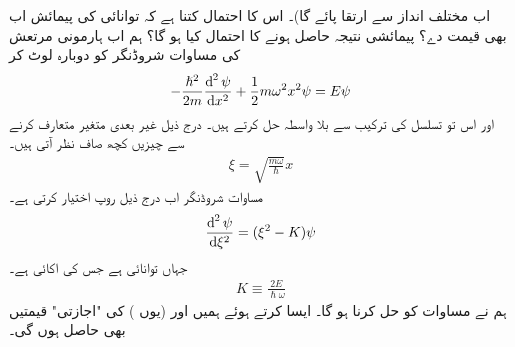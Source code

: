اب مختلف انداز سے ارتقا پائے گا)۔ اس کا احتمال کتنا ہے کہ توانائی کی پیمائش اب بھی  قیمت دے؟ پیمائشی نتیجہ  حاصل ہونے کا احتمال کیا ہو گا؟
ہم اب ہارمونی مرتعش کی مساوات شروڈنگر کو دوبارہ لوٹ کر
\begin{align}\label{مساوات_شروڈنگر_تحلیلی_حل_الف}
-\frac{\hslash^{2}}{2m}\frac{\dif^{\,2}\psi}{\dif x^{2}}+\frac{1}{2}m\omega^{2}x^{2}\psi=E\psi
\end{align}
اور اس تو تسلسل کی ترکیب سے بلا واسطہ حل کرتے ہیں۔ درج ذیل غیر بعدی متغیر متعارف کرنے سے چیزیں کچھ صاف نظر آتی ہیں۔
\begin{align}
\xi=\sqrt{\frac{m\omega}{\hslash}}x
\end{align}
مساوات شروڈنگر اب درج ذیل روپ اختیار کرتی ہے۔
\begin{align}\label{مساوات_شروڈنگر_تحلیلی_شروڈنگر}
\frac{\dif^{\,2}\psi}{\dif \xi^{2}}=(\xi^{2}-K)\psi
\end{align}
جہاں  توانائی ہے جس کی اکائی  ہے۔
\begin{align}\label{مساوات_شروڈنگر_تحلیلی_مستقل}
K\equiv \frac{2E}{\hslash\omega}
\end{align}
ہم نے مساوات  کو حل کرنا ہو گا۔ ایسا کرتے ہوئے ہمیں  اور (یوں ) کی "اجازتی" قیمتیں بھی حاصل ہوں گی۔ 


